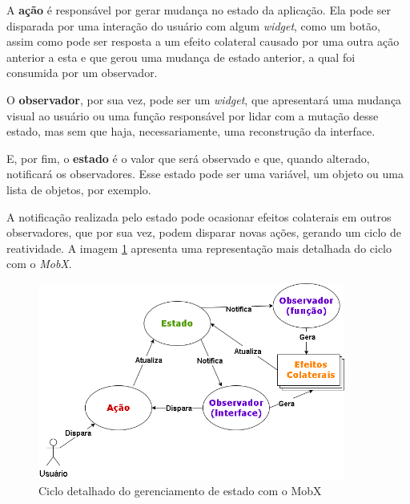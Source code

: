 A \textbf{ação} é responsável por gerar mudança no estado da aplicação. Ela pode ser disparada por uma interação do usuário com algum \textit{widget}, como um botão, assim como pode ser resposta a um efeito colateral causado por uma outra ação anterior a esta e que gerou uma mudança de estado anterior, a qual foi consumida por um observador.

O \textbf{observador}, por sua vez, pode ser um \textit{widget}, que apresentará uma mudança visual ao usuário ou uma função responsável por lidar com a mutação desse estado, mas sem que haja, necessariamente, uma reconstrução da interface.

E, por fim, o \textbf{estado} é o valor que será observado e que, quando alterado, notificará os observadores. Esse estado pode ser uma variável, um objeto ou uma lista de objetos, por exemplo.

A notificação realizada pelo estado pode ocasionar efeitos colaterais em outros observadores, que por sua vez, podem disparar novas ações, gerando um ciclo de reatividade. A imagem \ref{fig:mobx-details} apresenta uma representação mais detalhada do ciclo com o \textit{MobX}.

\begin{figure}[!ht]
  \centering
  \includegraphics[width=0.9\textwidth]{figuras/cap2/2_2_6_mobx-details.png}
  \caption{Ciclo detalhado do gerenciamento de estado com o MobX \protect\cite{mobx-package} \protect\cite{podila18mobx}}
  \label{fig:mobx-details}
\end{figure}




